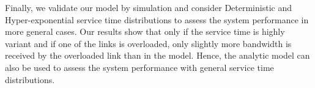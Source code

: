 Finally, we validate our model by simulation and consider Deterministic and Hyper-exponential service time distributions to assess the system performance in more general cases.
Our results show that only if the service time is highly variant and if one of the links is overloaded, only slightly more bandwidth is received by the overloaded link than in the model. Hence, the analytic model can also be used to assess the system performance with general service time distributions.

